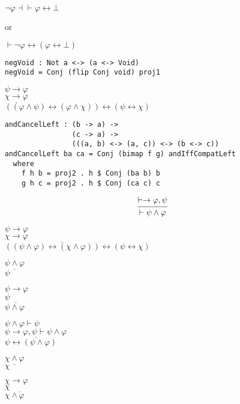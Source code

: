 \documentclass{acm_proc_article-sp}
\renewcommand{\iff}{\leftrightarrow}
\renewcommand{\implies}{\rightarrow}
\begin{document}
\(\neg \varphi \dashv\vdash \varphi \iff \bot\)

or

\(\vdash \neg \varphi \iff (\varphi \iff \bot)\)

\begin{verbatim}
negVoid : Not a <-> (a <-> Void)
negVoid = Conj (flip Conj void) proj1
\end{verbatim}

\(\psi \implies \varphi\)\\
\(\underline{\chi \implies \varphi}\)\\
\(((\varphi \land \psi) \iff (\varphi \land \chi)) \iff (\psi \iff \chi)\)

\begin{verbatim}
andCancelLeft : (b -> a) ->
                (c -> a) ->
                (((a, b) <-> (a, c)) <-> (b <-> c))
andCancelLeft ba ca = Conj (bimap f g) andIffCompatLeft
  where
    f h b = proj2 . h $ Conj (ba b) b
    g h c = proj2 . h $ Conj (ca c) c
\end{verbatim}

\[
  \begin{prooftree}
    \Hypo{ \vdash \implies \varphi, \psi }
    \Infer1{ \vdash \psi \land \varphi }
  \end{prooftree}
\]

\(\psi \implies \varphi\)\\
\(\underline{\chi \implies \varphi \quad\quad\quad\quad\quad\quad\quad\quad\quad\quad\quad}\)\\
\(((\psi \land \varphi) \iff (\chi \land \varphi)) \iff (\psi \iff \chi)\)

\(\underline{\psi \land \varphi}\)\\
\(\psi\)

\(\psi \implies \varphi\)\\
\(\underline{\psi\quad\quad}\)\\
\(\psi \land \varphi\)

\(\psi \land \varphi \vdash \psi\)\\
\(\underline{\psi \implies \varphi, \psi \vdash \psi \land \varphi}\)\\
\(\psi \iff (\psi \land \varphi)\)

\(\underline{\chi \land \varphi}\)\\
\(\chi\)

\(\chi \implies \varphi\)\\
\(\underline{\chi\quad\quad\quad}\)\\
\(\chi \land \varphi\)
\end{document}
